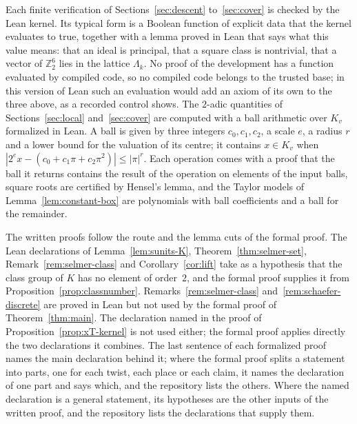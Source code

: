 \documentclass[11pt]{amsart}
\theoremstyle{definition}
\numberwithin{equation}{section}
\newcommand{\Zt}{\mathbb{Z}_2}
\newcommand{\kv}{K_v}
\begin{document}
Each finite verification of Sections~\ref{sec:descent} to~\ref{sec:cover} is checked by the Lean kernel. Its typical form is a Boolean function of explicit data that the kernel evaluates to true, together with a lemma proved in Lean that says what this value means: that an ideal is principal, that a square class is nontrivial, that a vector of $\Zt^6$ lies in the lattice $\Lambda_k$. No proof of the development has a function evaluated by compiled code, so no compiled code belongs to the trusted base; in this version of Lean such an evaluation would add an axiom of its own to the three above, as a recorded control shows. The $2$-adic quantities of Sections~\ref{sec:local} and~\ref{sec:cover} are computed with a ball arithmetic over $\kv$ formalized in Lean. A ball is given by three integers $c_0,c_1,c_2$, a scale $e$, a radius $r$ and a lower bound for the valuation of its centre; it contains $x\in\kv$ when $|2^ex-(c_0+c_1\pi+c_2\pi^2)|\le|\pi|^r$. Each operation comes with a proof that the ball it returns contains the result of the operation on elements of the input balls, square roots are certified by Hensel's lemma, and the Taylor models of Lemma~\ref{lem:constant-box} are polynomials with ball coefficients and a ball for the remainder.

The written proofs follow the route and the lemma cuts of the formal proof. The Lean declarations of Lemma~\ref{lem:sunits-K}, Theorem~\ref{thm:selmer-set}, Remark~\ref{rem:selmer-class} and Corollary~\ref{cor:lift} take as a hypothesis that the class group of $K$ has no element of order~$2$, and the formal proof supplies it from Proposition~\ref{prop:classnumber}. Remarks~\ref{rem:selmer-class} and~\ref{rem:schaefer-discrete} are proved in Lean but not used by the formal proof of Theorem~\ref{thm:main}. The declaration named in the proof of Proposition~\ref{prop:xT-kernel} is not used either; the formal proof applies directly the two declarations it combines. The last sentence of each formalized proof names the main declaration behind it; where the formal proof splits a statement into parts, one for each twist, each place or each claim, it names the declaration of one part and says which, and the repository lists the others. Where the named declaration is a general statement, its hypotheses are the other inputs of the written proof, and the repository lists the declarations that supply them.
\end{document}
